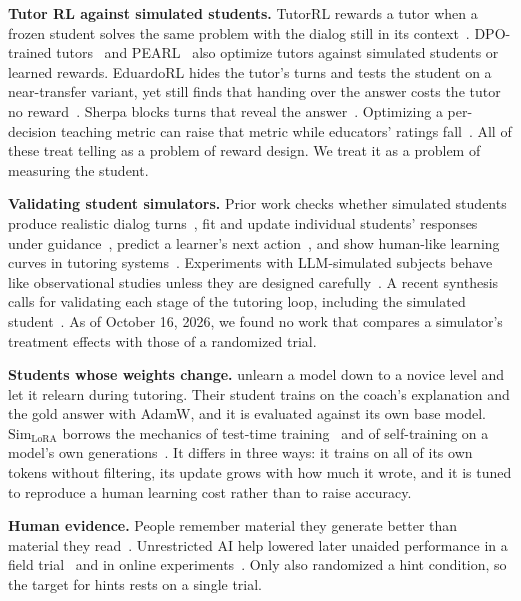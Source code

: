 \documentclass{article} %
\newcommand{\simL}{\ensuremath{\text{Sim}_{\text{LoRA}}}}
\begin{document}
\textbf{Tutor RL against simulated students.} TutorRL rewards a tutor when a frozen student solves the same problem with the dialog still in its context~\citep{dinucujianu2025tutorrl}. DPO-trained tutors~\citep{scarlatos2025training} and PEARL~\citep{chang2026pearl} also optimize tutors against simulated students or learned rewards. EduardoRL hides the tutor's turns and tests the student on a near-transfer variant, yet still finds that handing over the answer costs the tutor no reward~\citep{macina2026assistance}. Sherpa blocks turns that reveal the answer~\citep{xu2026sherpa}. Optimizing a per-decision teaching metric can raise that metric while educators' ratings fall~\citep{dominguez2026learner}. All of these treat telling as a problem of reward design. We treat it as a problem of measuring the student.

\textbf{Validating student simulators.} Prior work checks whether simulated students produce realistic dialog turns~\citep{scarlatos2026simulated}, fit and update individual students' responses under guidance~\citep{yang2026studentsim}, predict a learner's next action~\citep{jiang2026hachimi}, and show human-like learning curves in tutoring systems~\citep{weitekamp2025tutorgym}. Experiments with LLM-simulated subjects behave like observational studies unless they are designed carefully~\citep{lin2026illusion}. A recent synthesis calls for validating each stage of the tutoring loop, including the simulated student~\citep{adak2026tutors}. As of October 16, 2026, we found no work that compares a simulator's treatment effects with those of a randomized trial.

\textbf{Students whose weights change.} \citet{song2026novice} unlearn a model down to a novice level and let it relearn during tutoring. Their student trains on the coach's explanation and the gold answer with AdamW, and it is evaluated against its own base model. \simL{} borrows the mechanics of test-time training~\citep{sun2020ttt} and of self-training on a model's own generations~\citep{zelikman2022star,zuo2025ttrl,zweiger2025seal}. It differs in three ways: it trains on all of its own tokens without filtering, its update grows with how much it wrote, and it is tuned to reproduce a human learning cost rather than to raise accuracy.

\textbf{Human evidence.} People remember material they generate better than material they read~\citep{slamecka1978generation}. Unrestricted AI help lowered later unaided performance in a field trial~\citep{bastani2025harm} and in online experiments~\citep{liu2026assistance,shen2026skill}. Only \citet{bastani2025harm} also randomized a hint condition, so the target for hints rests on a single trial.
\end{document}

